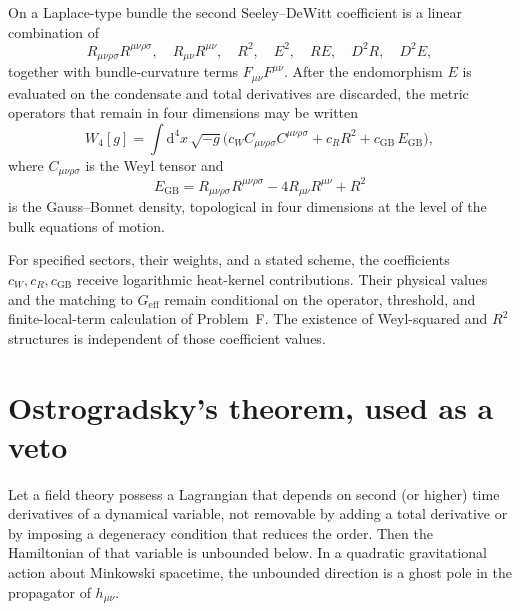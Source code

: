 On a Laplace-type bundle the second Seeley--DeWitt coefficient is a
linear combination of
\begin{equation}
  \label{eq:a2-ops}
  R_{\mu\nu\rho\sigma}R^{\mu\nu\rho\sigma},
  \quad
  R_{\mu\nu}R^{\mu\nu},
  \quad
  R^2,
  \quad
  E^2,
  \quad
  RE,
  \quad
  D^2 R,\quad
  D^2 E,
\end{equation}
together with bundle-curvature terms \(F_{\mu\nu}F^{\mu\nu}\). After
the endomorphism \(E\) is evaluated on the condensate and total
derivatives are discarded, the metric operators that remain in four
dimensions may be written
\begin{equation}
  \label{eq:W4}
  W_4[g]
  =\int\mathrm{d}^4x\,\sqrt{-g}
   \bigl(
     c_W C_{\mu\nu\rho\sigma}C^{\mu\nu\rho\sigma}
     +c_R R^2
     +c_{\mathrm{GB}}\,E_{\mathrm{GB}}
   \bigr),
\end{equation}
where \(C_{\mu\nu\rho\sigma}\) is the Weyl tensor and
\begin{equation}
  \label{eq:GB}
  E_{\mathrm{GB}}
  =R_{\mu\nu\rho\sigma}R^{\mu\nu\rho\sigma}
   -4R_{\mu\nu}R^{\mu\nu}
   +R^2
\end{equation}
is the Gauss--Bonnet density, topological in four dimensions at the
level of the bulk equations of motion.

For specified sectors, their weights, and a stated scheme, the
coefficients \(c_W,c_R,c_{\mathrm{GB}}\) receive logarithmic
heat-kernel contributions. Their physical values and the matching
to \(G_{\mathrm{eff}}\) remain conditional on the operator,
threshold, and finite-local-term calculation of Problem~F. The
existence of Weyl-squared and \(R^2\) structures is independent of
those coefficient values.

\section{Ostrogradsky's theorem, used as a veto}
\label{sec:ch9-ostro}

\begin{theorem}
  \label{thm:ostro}
  Let a field theory possess a Lagrangian that depends on second
  (or higher) time derivatives of a dynamical variable, not
  removable by adding a total derivative or by imposing a
  degeneracy condition that reduces the order. Then the Hamiltonian
  of that variable is unbounded below. In a quadratic gravitational
  action about Minkowski spacetime, the unbounded direction is a
  ghost pole in the propagator of \(h_{\mu\nu}\).
\end{theorem}

